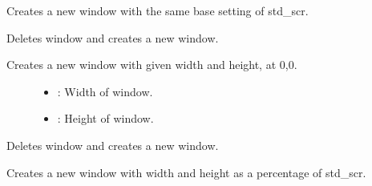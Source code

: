 \documentclass[letterpaper,10pt,english]{sphinxmanual}
\begin{document}
\begin{fulllineitems}
\begin{fulllineitems}
Creates a new window with the same base setting of std\_scr. \begin{description}
\item[{}] \leavevmode
{\hyperref[\detokenize{index:Pessumnamespaceostendo_1a4c5850c8a109e159e874ecce8a5dc62a}]{}} 

\end{description}


\end{fulllineitems}


\begin{fulllineitems}
\label{\detokenize{index:_CPPv2N7ostendo6Window9NewWindowEii}}%
\pysigstartmultiline
{}\label{\detokenize{index:Pessumclassostendo_1_1Window_1a61cbdf968a481f95b6b806ca9332e6c4}}%
\pysigstopmultiline
Deletes window and creates a new window. 

Creates a new window with given width and height, at 0,0. \begin{description}
\item[{}] \leavevmode\begin{itemize}
\item {} 
: Width of window. 

\item {} 
: Height of window. 

\end{itemize}

\end{description}


\end{fulllineitems}


\begin{fulllineitems}
\label{\detokenize{index:_CPPv2N7ostendo6Window9NewWindowEdd}}%
\pysigstartmultiline
{}\label{\detokenize{index:Pessumclassostendo_1_1Window_1a5d79595ea48972fc2e1752890d5e815b}}%
\pysigstopmultiline
Deletes window and creates a new window. 

Creates a new window with width and height as a percentage of std\_scr. \begin{description}
\item[{}] \leavevmode
{\hyperref[\detokenize{index:Pessumnamespaceostendo_1a4c5850c8a109e159e874ecce8a5dc62a}]{}} 


\end{description}
\end{fulllineitems}
\end{fulllineitems}
\end{document}
